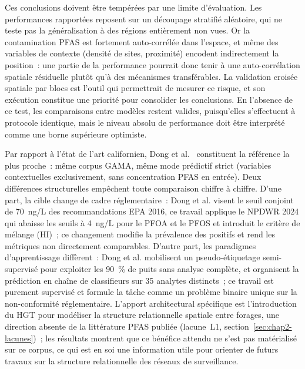 Ces conclusions doivent \^etre temp\'er\'ees par une limite d'\'evaluation. Les performances rapport\'ees reposent sur un d\'ecoupage stratifi\'e al\'eatoire, qui ne teste pas la g\'en\'eralisation \`a des r\'egions enti\`erement non vues. Or la contamination PFAS est fortement auto-corr\'el\'ee dans l'espace, et m\^eme des variables de contexte (densit\'e de sites, proximit\'e) encodent indirectement la position~: une partie de la performance pourrait donc tenir \`a une auto-corr\'elation spatiale r\'esiduelle plut\^ot qu'\`a des m\'ecanismes transf\'erables. La validation crois\'ee spatiale par blocs est l'outil qui permettrait de mesurer ce risque, et son ex\'ecution constitue une priorit\'e pour consolider les conclusions. En l'absence de ce test, les comparaisons entre mod\`eles restent valides, puisqu'elles s'effectuent \`a protocole identique, mais le niveau absolu de performance doit \^etre interpr\'et\'e comme une borne sup\'erieure optimiste.

Par rapport \`a l'\'etat de l'art californien, Dong et al.~\cite{dong2024pfas} constituent la r\'ef\'erence la plus proche~: m\^eme corpus GAMA, m\^eme mode pr\'edictif strict (variables contextuelles exclusivement, sans concentration PFAS en entr\'ee). Deux diff\'erences structurelles emp\^echent toute comparaison chiffre \`a chiffre. D'une part, la cible change de cadre r\'eglementaire~: Dong et al. visent le seuil conjoint de 70~ng/L des recommandations EPA 2016, ce travail applique le NPDWR 2024 qui abaisse les seuils \`a 4~ng/L pour le PFOA et le PFOS et introduit le crit\`ere de m\'elange (HI)~; ce changement modifie la pr\'evalence des positifs et rend les m\'etriques non directement comparables. D'autre part, les paradigmes d'apprentissage diff\`erent~: Dong et al. mobilisent un pseudo-\'etiquetage semi-supervis\'e pour exploiter les 90~\% de puits sans analyse compl\`ete, et organisent la pr\'ediction en cha\^ine de classifieurs sur 35 analytes distincts~; ce travail est purement supervis\'e et formule la t\^ache comme un probl\`eme binaire unique sur la non-conformit\'e r\'eglementaire. L'apport architectural sp\'ecifique est l'introduction du HGT pour mod\'eliser la structure relationnelle spatiale entre forages, une direction absente de la litt\'erature PFAS publi\'ee (lacune~L1, section~\ref{sec:chap2-lacunes})~; les r\'esultats montrent que ce b\'en\'efice attendu ne s'est pas mat\'erialis\'e sur ce corpus, ce qui est en soi une information utile pour orienter de futurs travaux sur la structure relationnelle des r\'eseaux de surveillance.

